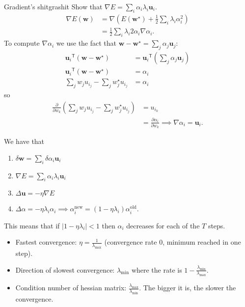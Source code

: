 \documentclass[a4paper,9pt]{extarticle}
\newcommand{\trans}[1]{{#1}^{\mathsf{T}}}
\begin{document}
\begin{multicols*}{2}
\begin{myproof}{Gradient's shit}{grashit}
			Show that $\nabla E=\sum_{i}\alpha_{i}\lambda_{i}\mathbf{u}_{i}$.
			\begin{align*}
				\nabla E(\mathbf{w})&=\nabla\left(E(\mathbf{w}^{\star})+\frac{1}{2}\sum_{i}\lambda_{i}\alpha_{i}^{2}\right)\\
				&=\frac{1}{2}\sum_{i}\lambda_{i}2\alpha_{i}\nabla \alpha_{i}.
			\end{align*}
			To compute $\nabla\alpha_{i}$ we use the fact that $\mathbf{w-w}^{\star}=\sum_{j}\alpha_{j}\mathbf{u}_{j}$:
			\begin{align*}
				\trans{\mathbf{u}_{i}}(\mathbf{w-w}^{\star})&=\trans{\mathbf{u}_{i}}\left(\sum_{j}\alpha_{j}\mathbf{u}_{j}\right)\\
				\trans{\mathbf{u}_{i}}(\mathbf{w-w}^{\star})&=\alpha_{i}\\
				\sum_{j}w_{j}u_{i_{j}}-\sum_{j}w_{j}^{\star}u_{i_{j}}&=\alpha_{i}
			\end{align*}
			so
			\begin{align*}
				\frac{\partial}{\partial w_{k}}\left(\sum_{j}w_{j}u_{i_{j}}-\sum_{j}w_{j}^{\star}u_{i_{j}}\right)&=u_{i_{k}}\\
				&=\frac{\partial \alpha_{i}}{\partial w_{k}}\implies\nabla \alpha_{i}=\mathbf{u}_{i}.
			\end{align*}
		\end{myproof}
		\begin{riquadro}
			We have that
			\begin{enumerate}[$\bullet$]
				\item $\delta\mathbf{w}=\sum_{i}\delta\alpha_{i}\mathbf{u}_{i}$
				\item $\nabla E=\sum_{i}\alpha_{i}\lambda_{i}\mathbf{u}_{i}$
				\item $\Delta\mathbf{u}=-\eta\nabla E$
				\item $\varDelta\alpha=-\eta\lambda_{i}\alpha_{i}\implies \alpha^{\mathrm{new}}_{i}=(1-\eta\lambda_{i})\alpha^{\mathrm{old}}_{i}$.
			\end{enumerate}
		\end{riquadro}
		This means that if $|1-\eta\lambda_{i}|<1$ then $\alpha_{i}$ decreases for each of the $T$ steps.
		\begin{itemize}
			\item Fastest convergence: $\eta=\frac{1}{\lambda_{\mathrm{max}}}$ (convergence rate 0, minimum reached in one step).
			\item Direction of slowest convergence: $\lambda_{\mathrm{min}}$ where the rate is $1-\frac{\lambda_{\mathrm{min}}}{\lambda_{\mathrm{max}}}$.
			\item Condition number of hessian matrix: $\frac{\lambda_{\mathrm{max}}}{\lambda_{\mathrm{min}}}$. The bigger it is, the slower the convergence.
		\end{itemize}

\end{multicols*}
\end{document}
